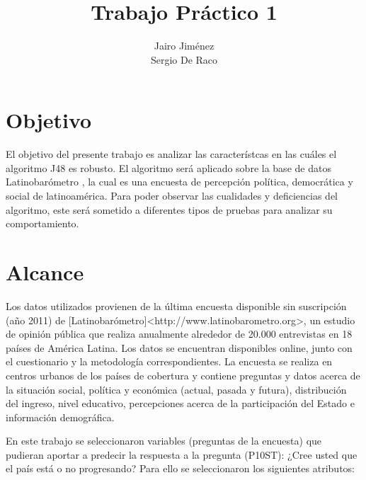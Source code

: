 \documentclass[]{article}
\title{Trabajo Práctico 1}
\author{Jairo Jiménez \\
	Sergio De Raco}
\begin{document}
\maketitle


\section*{Objetivo}
El objetivo del presente trabajo es analizar las característcas en las cuáles el algoritmo J48 es robusto. El algoritmo será aplicado sobre la base de datos Latinobarómetro \cite{Latinobarometro2011}, la cual es una encuesta de percepción política, democrática y social de latinoamérica. Para poder observar las cualidades y deficiencias del algoritmo, este será sometido a diferentes tipos de pruebas para analizar su comportamiento.

\section*{Alcance}

Los datos utilizados provienen de la última encuesta disponible sin suscripción (año 2011) de [Latinobarómetro]<http://www.latinobarometro.org>, un estudio de opinión pública que realiza anualmente alrededor de 20.000 entrevistas en 18 países de América Latina. Los datos se encuentran disponibles online, junto con el cuestionario y la metodología correspondientes.
La encuesta se realiza en centros urbanos de los países de cobertura y contiene preguntas y datos acerca de la situación social, política y económica (actual, pasada y futura), distribución del ingreso, nivel educativo, percepciones acerca de la participación del Estado e información demográfica.

En este trabajo se seleccionaron variables (preguntas de la encuesta) que pudieran aportar a predecir la respuesta a la pregunta (P10ST):  ¿Cree usted que el país está o no progresando? Para ello se seleccionaron los siguientes atributos: 
\end{document}
